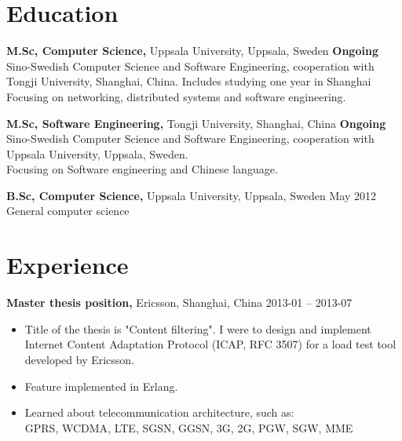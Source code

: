 \documentclass[margin]{res}
\begin{document}

\address{{\bf Contact information}\\

linkedin.com/in/tommymattsson\\
github.com/Taddic\\
}

\address{{\bf Address}\\
  \\
}

\begin{resume}


\section{Education}
{\bf M.Sc,  Computer Science,} Uppsala University, Uppsala, Sweden \hfill \textbf{Ongoing} \\
Sino-Swedish Computer Science and Software Engineering, cooperation with Tongji University, Shanghai, China. Includes studying one year in Shanghai \\
Focusing on networking, distributed systems and software engineering.

{\bf M.Sc, Software Engineering,} Tongji University, Shanghai, China \hfill \textbf{Ongoing} \\
Sino-Swedish Computer Science and Software Engineering, cooperation with Uppsala University, Uppsala, Sweden.\\
Focusing on Software engineering and Chinese language.

{\bf B.Sc, Computer Science,} Uppsala University, Uppsala, Sweden \hfill May 2012 \\
General computer science



\section{Experience}
{\bf Master thesis position,} Ericsson, Shanghai, China \hfill 2013-01 -- 2013-07
 \begin{itemize} \itemsep -2pt  %
 \item Title of the thesis is "Content filtering". I were to design and implement Internet Content Adaptation Protocol (ICAP, RFC 3507) for a load test tool developed by Ericsson.
 \item Feature implemented in Erlang.
 \item Learned about telecommunication architecture, such as: \\
 GPRS, WCDMA, LTE, SGSN, GGSN, 3G, 2G, PGW, SGW, MME
 \end{itemize}


\end{resume}
\end{document}
